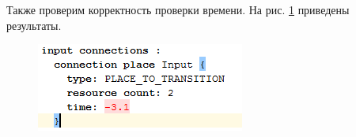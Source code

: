 			Также проверим корректность проверки времени. На рис. \ref{fig:time} приведены результаты.
	
			\begin{figure}[th]
				\centering
				\includegraphics[width=0.7\linewidth]{images/test-project/time}
				\caption{}
				\label{fig:time}
			\end{figure}
		
	
